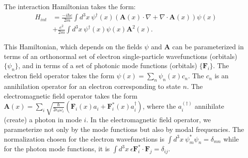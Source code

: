 \documentclass[aps,prl,twocolumn,
	groupedaddress,superscriptaddress,
	amsfonts,amssymb,amsmath,floatfix,
	citeautoscript]{revtex4-1}
\begin{document}
The interaction Hamiltonian takes the form:
\begin{align}
H_{int} &= \frac{-i\hbar e}{2m}\int d^3x ~\psi^{\dagger}(x)(\mathbf{A}(x)\cdot\nabla +  \nabla \cdot \mathbf{A}(x))\psi(x) \nonumber \\ &+ \frac{e^2}{2m}\int d^3x ~\psi^{\dagger}(x)\psi(x)\mathbf{A}^2(x).
\end{align}

This Hamiltonian, which depends on the fields $\psi$ and $\mathbf{A}$ can be parameterized in terms of an orthonormal set of electron single-particle wavefunctions (orbitals) $\{\psi_n\}$, and in terms of a set of photonic mode functions (orbitals) $\{\mathbf{F}_i\}$. The electron field operator takes the form $\psi(x) = \sum_n \psi_n(x)c_n$.
The $c_n$ is an annihilation operator for an electron corresponding to state $n$. The electromagnetic field operator takes the form $\mathbf{A}(x) = \sum_i\sqrt{\frac{\hbar}{2\epsilon_0\omega_i}} \left(\mathbf{F}_i(x)a_i+\mathbf{F}^*_i(x)a^{\dagger}_i\right)$, where the $a_i^{(\dagger)}$ annihilate (create) a photon in mode $i$. In the electromagnetic field operator, we parameterize not only by the mode functions but also by modal frequencies. The normalization chosen for the electron wavefunctions is $\int d^3x~ \psi_m^*\psi_n = \delta_{mn}$ while for the photon mode functions, it is $\int d^3x~\epsilon\mathbf{F}_i^*\cdot\mathbf{F}_j = \delta_{ij}.$
\end{document}
